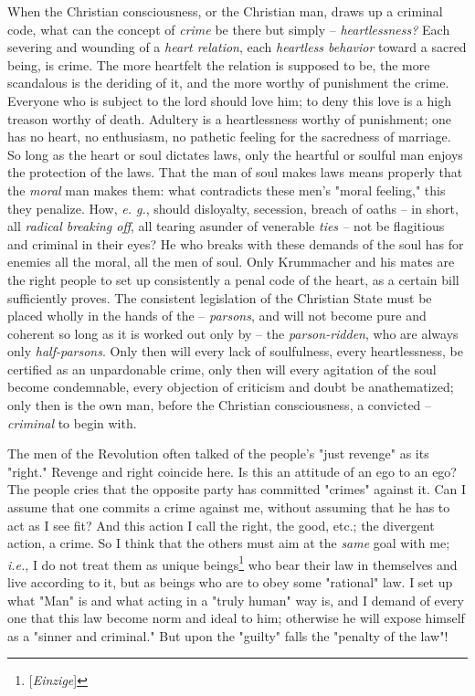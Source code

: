 When the Christian consciousness, or the Christian man, draws up a criminal 
code, what can the concept of \textit{crime} be there but simply -- 
\textit{heartlessness?} Each severing and wounding of a \textit{heart 
relation}, each \textit{heartless behavior} toward a sacred being, is crime. 
The more heartfelt the relation is supposed to be, the more scandalous is the 
deriding of it, and the more worthy of punishment the crime. Everyone who is 
subject to the lord should love him; to deny this love is a high treason 
worthy of death. Adultery is a heartlessness worthy of punishment; one has no 
heart, no enthusiasm, no pathetic feeling for the sacredness of marriage. So 
long as the heart or soul dictates laws, only the heartful or soulful man 
enjoys the protection of the laws. That the man of soul makes laws means 
properly that the \textit{moral} man makes them: what contradicts these men's 
"{}moral feeling,"{} this they penalize. How, \textit{e. g.}, should 
disloyalty, secession, breach of oaths -- in short, all \textit{radical 
breaking off}, all tearing asunder of venerable \textit{ties --} not be 
flagitious and criminal in their eyes? He who breaks with these demands of the 
soul has for enemies all the moral, all the men of soul. Only Krummacher and 
his mates are the right people to set up consistently a penal code of the 
heart, as a certain bill sufficiently proves. The consistent legislation of 
the Christian State must be placed wholly in the hands of the -- 
\textit{parsons}, and will not become pure and coherent so long as it is 
worked out only by -- the \textit{parson-ridden}, who are always only 
\textit{half-parsons}. Only then will every lack of soulfulness, every 
heartlessness, be certified as an unpardonable crime, only then will every 
agitation of the soul become condemnable, every objection of criticism and 
doubt be anathematized; only then is the own man, before the Christian 
consciousness, a convicted -- \textit{criminal} to begin with.

The men of the Revolution often talked of the people's "{}just revenge"{} as 
its "{}right."{} Revenge and right coincide here. Is this an attitude of an 
ego to an ego? The people cries that the opposite party has committed 
"{}crimes"{} against it. Can I assume that one commits a crime against me, 
without assuming that he has to act as I see fit? And this action I call the 
right, the good, etc.; the divergent action, a crime. So I think that the 
others must aim at the \textit{same} goal with me; \textit{i.e.}, I do not 
treat them as unique beings\footnote{[\textit{Einzige}]} who bear their law in 
themselves and live according to it, but as beings who are to obey some 
"{}rational"{} law. I set up what "{}Man"{} is and what acting in a "{}truly 
human"{} way is, and I demand of every one that this law become norm and ideal 
to him; otherwise he will expose himself as a "{}sinner and criminal."{} But 
upon the "{}guilty"{} falls the "{}penalty of the law"{}!


